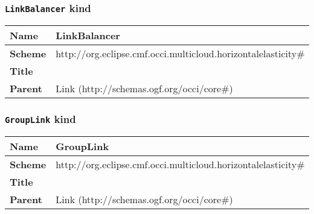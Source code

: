 \subsubsection{\texttt{LinkBalancer} kind}
\begin{center}
\begin{tabular}{|l|l|}
  \hline
  \textbf{Name} & LinkBalancer \\
  \hline  
  \textbf{Scheme} & http://org.eclipse.cmf.occi.multicloud.horizontalelasticity\# \\
  \hline
  \textbf{Title} &  \\
  \hline
  \textbf{Parent} & Link (http://schemas.ogf.org/occi/core\#) \\
  \hline
\end{tabular}
\end{center}



\subsubsection{\texttt{GroupLink} kind}
\begin{center}
\begin{tabular}{|l|l|}
  \hline
  \textbf{Name} & GroupLink \\
  \hline  
  \textbf{Scheme} & http://org.eclipse.cmf.occi.multicloud.horizontalelasticity\# \\
  \hline
  \textbf{Title} &  \\
  \hline
  \textbf{Parent} & Link (http://schemas.ogf.org/occi/core\#) \\
  \hline
\end{tabular}
\end{center}



